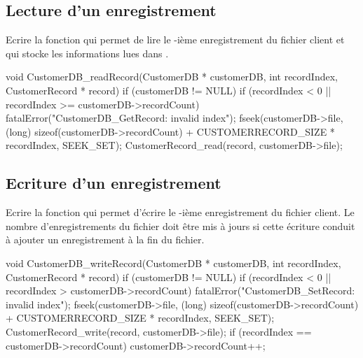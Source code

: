 \subsection{Lecture d'un enregistrement}

Ecrire la fonction  \linebreak{} qui permet de lire le -ième enregistrement du fichier client et qui stocke les informations lues dans .

\begin{csourcecorrection}
void CustomerDB_readRecord(CustomerDB * customerDB, int recordIndex,  CustomerRecord * record) {
    if (customerDB != NULL) {
        if (recordIndex < 0 || recordIndex >= customerDB->recordCount)
            fatalError("CustomerDB_GetRecord: invalid index");
        fseek(customerDB->file, (long) sizeof(customerDB->recordCount) + CUSTOMERRECORD_SIZE * recordIndex, SEEK_SET);
        CustomerRecord_read(record, customerDB->file);
    }
}
\end{csourcecorrection}

\subsection{Ecriture d'un enregistrement}

Ecrire la fonction \linebreak{} qui permet d'écrire le -ième enregistrement du fichier client. Le nombre d'enregistrements du fichier doit être mis à jours si cette écriture conduit à ajouter un enregistrement à la fin du fichier.

\begin{csourcecorrection}
void CustomerDB_writeRecord(CustomerDB * customerDB, int recordIndex, CustomerRecord * record) {
    if (customerDB != NULL) {
        if (recordIndex < 0 || recordIndex > customerDB->recordCount)
            fatalError("CustomerDB_SetRecord: invalid index");
        fseek(customerDB->file, (long) sizeof(customerDB->recordCount) + CUSTOMERRECORD_SIZE * recordIndex, SEEK_SET);
        CustomerRecord_write(record, customerDB->file);
        if (recordIndex == customerDB->recordCount)
            customerDB->recordCount++;
    }
}
\end{csourcecorrection}

